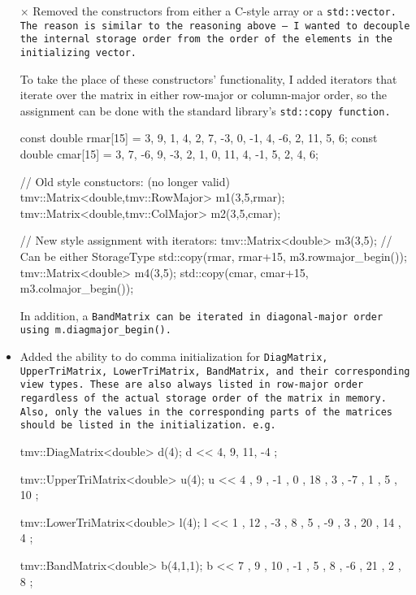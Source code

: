 \begin{itemize}
\item[$\times$] 
Removed the constructors from either a C-style array or a \tt{std::vector}.  The reason is similar to the reasoning above -- I wanted to decouple the internal storage order from the order of the elements in the initializing vector. 

To take the place of these constructors' functionality, I added iterators that iterate over the matrix in either row-major or column-major order, so the assignment can be done with the standard library's \tt{std::copy} function.

\begin{tmvcode}
const double rmar[15] = 
    { 3, 9, 1, 4, 2, 7, -3, 0, -1, 4, -6, 2, 11, 5, 6};
const double cmar[15] = 
    { 3, 7, -6, 9, -3, 2, 1, 0, 11, 4, -1, 5, 2, 4, 6};

// Old style constuctors: (no longer valid)
tmv::Matrix<double,tmv::RowMajor> m1(3,5,rmar);
tmv::Matrix<double,tmv::ColMajor> m2(3,5,cmar);

// New style assignment with iterators:
tmv::Matrix<double> m3(3,5); // Can be either StorageType
std::copy(rmar, rmar+15, m3.rowmajor_begin());
tmv::Matrix<double> m4(3,5);
std::copy(cmar, cmar+15, m3.colmajor_begin());
\end{tmvcode}

In addition, a \tt{BandMatrix} can be iterated in diagonal-major order using \tt{m.diagmajor\_begin()}.

\item 
Added the ability to do comma initialization for \tt{DiagMatrix}, \tt{UpperTriMatrix}, \tt{LowerTriMatrix}, \tt{BandMatrix}, and their corresponding view types.  These are also always listed in row-major order regardless of the actual storage order of the matrix in memory.  Also, only the values in the corresponding parts of the matrices should be listed in the initialization.  e.g.
\begin{tmvcode}
tmv::DiagMatrix<double> d(4);
d << 4,
        9,
           11,
              -4 ;
              
tmv::UpperTriMatrix<double> u(4);
u << 4 ,  9 , -1 ,  0 ,
         18 ,  3 , -7 ,
               1 ,  5 ,
                   10 ;
                   
tmv::LowerTriMatrix<double> l(4);
l <<  1 ,
     12 , -3 ,
      8 ,  5 , -9 ,
      3 , 20 , 14 ,  4 ;
      
tmv::BandMatrix<double> b(4,1,1);
b <<  7 ,  9 ,
     10 , -1 ,  5 ,
           8 , -6 , 21 ,
                2 ,  8 ;
\end{tmvcode}


\end{itemize}
